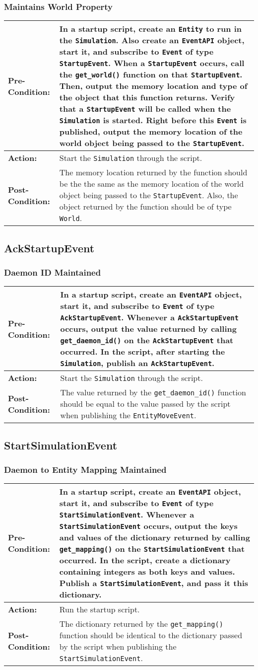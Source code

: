 \documentclass[titlepage]{article}
\newcommand{\testcase}[3]{
    \begin{center}
    \begin{tabular}{| l | p{0.7\textwidth}|}
        \hline
        \rowcolor[gray]{0.8}\textbf{Pre-Condition:} & #1 \\ \hline
        \textbf{Action:} & #2 \\ \hline
        \rowcolor[gray]{0.8}\textbf{Post-Condition:} & #3 \\ \hline
    \end{tabular}
    \end{center}
}
\begin{document}
\subsubsection{Maintains World Property}
\testcase{In a startup script, create an \texttt{Entity} to run in the \texttt{Simulation}. Also create an \texttt{EventAPI} object, start it, and subscribe to \texttt{Event} of type \texttt{StartupEvent}. When a \texttt{StartupEvent} occurs, call the \texttt{get\_world()} function on that \texttt{StartupEvent}. Then, output the memory location and type of the object that this function returns.  Verify that a \texttt{StartupEvent} will be called when the \texttt{Simulation} is started. Right before this \texttt{Event} is published, output the memory location of the world object being passed to the \texttt{StartupEvent}.}{Start the \texttt{Simulation} through the script.}{The memory location returned by the function should be the the same as the memory location of the world object being passed to the \texttt{StartupEvent}. Also, the object returned by the function should be of type \texttt{World}.}

\subsection{AckStartupEvent}
\subsubsection{Daemon ID Maintained}
\testcase{In a startup script, create an \texttt{EventAPI} object, start it, and subscribe to \texttt{Event} of type \texttt{AckStartupEvent}. Whenever a \texttt{AckStartupEvent} occurs, output the value returned by calling \texttt{get\_daemon\_id()} on the \texttt{AckStartupEvent} that occurred. In the script, after starting the \texttt{Simulation}, publish an \texttt{AckStartupEvent}.}{Start the \texttt{Simulation} through the script.}{The value returned by the \texttt{get\_daemon\_id()} function should be equal to the value passed by the script when publishing the \texttt{EntityMoveEvent}.}

\subsection{StartSimulationEvent}
\subsubsection{Daemon to Entity Mapping Maintained}
\testcase{In a startup script, create an \texttt{EventAPI} object, start it, and subscribe to \texttt{Event} of type \texttt{StartSimulationEvent}. Whenever a \texttt{StartSimulationEvent} occurs, output the keys and values of the dictionary returned by calling \texttt{get\_mapping()} on the \texttt{StartSimulationEvent} that occurred. In the script, create a dictionary containing integers as both keys and values. Publish a \texttt{StartSimulationEvent}, and pass it this dictionary.}{Run the startup script.}{The dictionary returned by the \texttt{get\_mapping()} function should be identical to the dictionary passed by the script when publishing the \texttt{StartSimulationEvent}.}
\end{document}
